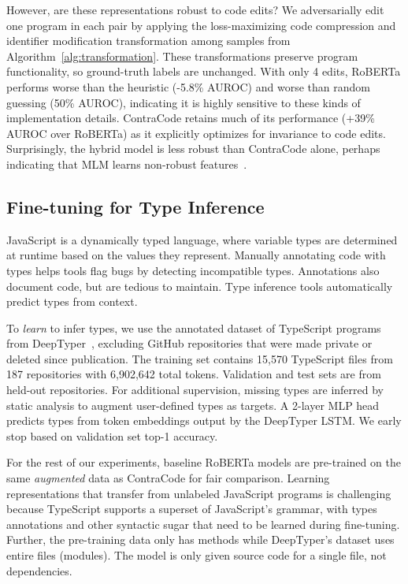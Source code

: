 \documentclass[11pt]{article}
\newcommand{\ours}[0]{ContraCode}
\begin{document}
However, are these representations robust to code edits? We adversarially edit one program in each pair by applying the loss-maximizing code compression and identifier modification transformation among  samples from Algorithm~\ref{alg:transformation}. These transformations preserve program functionality, so ground-truth labels are unchanged. With only 4 edits, RoBERTa performs worse than the heuristic (-5.8\% AUROC) and worse than random guessing (50\% AUROC), indicating it is highly sensitive to these kinds of implementation details. \ours{} retains much of its performance (+39\% AUROC over RoBERTa) as it explicitly optimizes for invariance to code edits. Surprisingly, the hybrid model is less robust than \ours{} alone, perhaps indicating that MLM learns non-robust features~\cite{NEURIPS2019_e2c420d9}.

\subsection{Fine-tuning for Type Inference}
\label{sec:experiments_type_inference}
JavaScript is a dynamically typed language, where variable types are determined at runtime based on the values they represent. Manually annotating code with types helps tools flag bugs by detecting incompatible types. Annotations also document code, but are tedious to maintain. Type inference tools automatically predict types from context.

To \textit{learn} to infer types, we use the annotated dataset of TypeScript programs from DeepTyper~\citep{hellendoorn2018deep}, excluding GitHub repositories that were made private or deleted since publication.
The training set contains 15,570 TypeScript files from 187 repositories with 6,902,642 total tokens. Validation and test sets are from held-out repositories.
For additional supervision, missing types are inferred by static analysis to augment user-defined types as targets.
A 2-layer MLP head predicts types from token embeddings output by the DeepTyper LSTM. We early stop based on validation set top-1 accuracy.

For the rest of our experiments, baseline RoBERTa models are pre-trained on the same \textit{augmented} data as \ours{} for fair comparison. Learning representations that transfer from unlabeled JavaScript programs is challenging because TypeScript supports a superset of JavaScript's grammar, with types annotations and other syntactic sugar that need to be learned during fine-tuning. Further, the pre-training data only has methods while DeepTyper's dataset uses entire files (modules). 
The model is only given source code for a single file, not dependencies.
\end{document}
